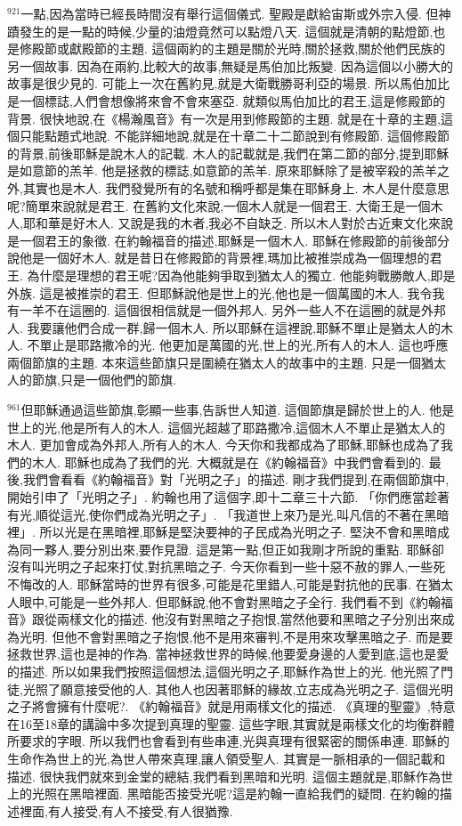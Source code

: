 \documentclass{book}
\begin{document}
$^{921}$一點,因為當時已經長時間沒有舉行這個儀式.
聖殿是獻給宙斯或外宗入侵.
但神蹟發生的是一點的時候,少量的油燈竟然可以點燈八天.
這個就是清朝的點燈節,也是修殿節或獻殿節的主題.
這個兩約的主題是關於光時,關於拯救,關於他們民族的另一個故事.
因為在兩約,比較大的故事,無疑是馬伯加比叛變.
因為這個以小勝大的故事是很少見的.
可能上一次在舊約見,就是大衛戰勝哥利亞的場景.
所以馬伯加比是一個標誌,人們會想像將來會不會來塞亞.
就類似馬伯加比的君王,這是修殿節的背景.
很快地說,在《楊瀚風音》有一次是用到修殿節的主題.
就是在十章的主題,這個只能點題式地說.
不能詳細地說,就是在十章二十二節說到有修殿節.
這個修殿節的背景,前後耶穌是說木人的記載.
木人的記載就是,我們在第二節的部分,提到耶穌是如意節的羔羊.
他是拯救的標誌,如意節的羔羊.
原來耶穌除了是被宰殺的羔羊之外,其實也是木人.
我們發覺所有的名號和稱呼都是集在耶穌身上.
木人是什麼意思呢?簡單來說就是君王.
在舊約文化來說,一個木人就是一個君王.
大衛王是一個木人,耶和華是好木人.
又說是我的木者,我必不自缺乏.
所以木人對於古近東文化來說是一個君王的象徵.
在約翰福音的描述,耶穌是一個木人.
耶穌在修殿節的前後部分說他是一個好木人.
就是昔日在修殿節的背景裡,瑪加比被推崇成為一個理想的君王.
為什麼是理想的君王呢?因為他能夠爭取到猶太人的獨立.
他能夠戰勝敵人,即是外族.
這是被推崇的君王.
但耶穌說他是世上的光,他也是一個萬國的木人.
我令我有一羊不在這圈的.
這個很相信就是一個外邦人.
另外一些人不在這圈的就是外邦人.
我要讓他們合成一群,歸一個木人.
所以耶穌在這裡說,耶穌不單止是猶太人的木人.
不單止是耶路撒冷的光.
他更加是萬國的光,世上的光,所有人的木人.
這也呼應兩個節旗的主題.
本來這些節旗只是圍繞在猶太人的故事中的主題.
只是一個猶太人的節旗,只是一個他們的節旗.

$^{961}$但耶穌通過這些節旗,彰顯一些事,告訴世人知道.
這個節旗是歸於世上的人.
他是世上的光,他是所有人的木人.
這個光超越了耶路撒冷,這個木人不單止是猶太人的木人.
更加會成為外邦人,所有人的木人.
今天你和我都成為了耶穌,耶穌也成為了我們的木人.
耶穌也成為了我們的光.
大概就是在《約翰福音》中我們會看到的.
最後,我們會看看《約翰福音》對「光明之子」的描述.
剛才我們提到,在兩個節旗中,開始引申了「光明之子」.
約翰也用了這個字,即十二章三十六節.
「你們應當趁著有光,順從這光,使你們成為光明之子」.
「我道世上來乃是光,叫凡信的不著在黑暗裡」.
所以光是在黑暗裡,耶穌是堅決要神的子民成為光明之子.
堅決不會和黑暗成為同一夥人,要分別出來,要作見證.
這是第一點,但正如我剛才所說的重點.
耶穌卻沒有叫光明之子起來打仗,對抗黑暗之子.
今天你看到一些十惡不赦的罪人,一些死不悔改的人.
耶穌當時的世界有很多,可能是花里錯人,可能是對抗他的民事.
在猶太人眼中,可能是一些外邦人.
但耶穌說,他不會對黑暗之子全行.
我們看不到《約翰福音》跟從兩樣文化的描述.
他沒有對黑暗之子抱恨,當然他要和黑暗之子分別出來成為光明.
但他不會對黑暗之子抱恨,他不是用來審判,不是用來攻擊黑暗之子.
而是要拯救世界,這也是神的作為.
當神拯救世界的時候,他要愛身邊的人愛到底,這也是愛的描述.
所以如果我們按照這個想法,這個光明之子,耶穌作為世上的光.
他光照了門徒,光照了願意接受他的人.
其他人也因著耶穌的緣故,立志成為光明之子.
這個光明之子將會擁有什麼呢?.
《約翰福音》就是用兩樣文化的描述.
《真理的聖靈》,特意在16至18章的講論中多次提到真理的聖靈.
這些字眼,其實就是兩樣文化的均衡群體所要求的字眼.
所以我們也會看到有些串連,光與真理有很緊密的關係串連.
耶穌的生命作為世上的光,為世人帶來真理,讓人領受聖人.
其實是一脈相承的一個記載和描述.
很快我們就來到金堂的總結,我們看到黑暗和光明.
這個主題就是,耶穌作為世上的光照在黑暗裡面.
黑暗能否接受光呢?這是約翰一直給我們的疑問.
在約翰的描述裡面,有人接受,有人不接受,有人很猶豫.
\end{document}
